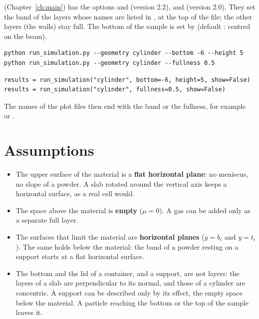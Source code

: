  (Chapter~\ref{ch:main}) has the options  and  (version 2.2), and
 (version 2.0). They set the band of the layers whose names are listed in , at the top
of the file; the other layers (the walls) stay full. The bottom of the sample is set by  (default
: centred on the beam).
\begin{lstlisting}[style=shell]
python run_simulation.py --geometry cylinder --bottom -6 --height 5
python run_simulation.py --geometry cylinder --fullness 0.5
\end{lstlisting}
\begin{lstlisting}
results = run_simulation("cylinder", bottom=-6, height=5, show=False)
results = run_simulation("cylinder", fullness=0.5, show=False)
\end{lstlisting}
The names of the plot files then end with the band or the fullness, for example\\
 or .

\section{Assumptions}

\begin{itemize}
  \item The upper surface of the material is a \textbf{flat horizontal plane}: no meniscus, no slope of a powder. A slab rotated around
        the vertical axis keeps a horizontal surface, as a real cell would.
  \item The space above the material is \textbf{empty} ($\mu=0$). A gas can be added only as a separate full layer.
  \item The surfaces that limit the material are \textbf{horizontal planes} ($y=b_i$ and $y=t_i$). The same holds below the material:
        the band of a powder resting on a support starts at a flat horizontal surface.
  \item The bottom and the lid of a container, and a support, are not layers: the layers of a slab are perpendicular to its normal,
        and those of a cylinder are concentric. A support can be described only by its effect, the empty space below the material.
        A particle reaching the bottom or the top of the sample leaves it.
\end{itemize}
